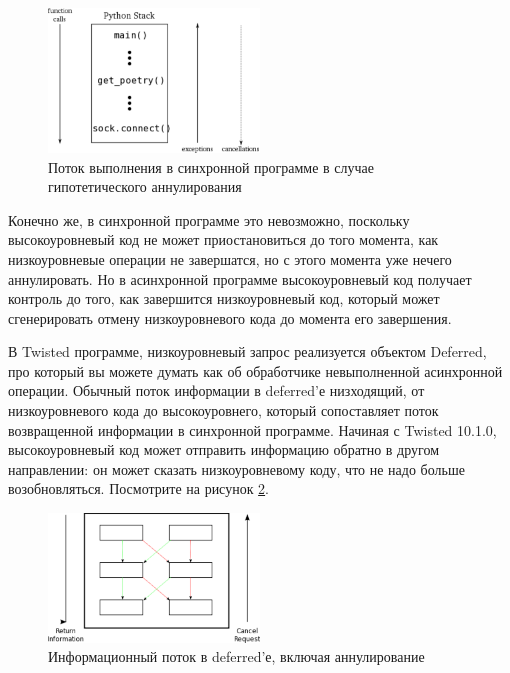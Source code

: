 \begin{figure}[h]
\begin{center}
    \includegraphics[width=0.5\textwidth]{images/sync-cancel.pdf}
    \caption{Поток выполнения в синхронной программе в случае гипотетического аннулирования\label{fig:sync-cancel}}
\end{center}
\end{figure}

Конечно же, в синхронной программе это невозможно, поскольку 
высокоуровневый код не может приостановиться до того 
момента, как низкоуровневые операции не завершатся, но с этого 
момента уже нечего аннулировать. Но в асинхронной программе 
высокоуровневый код получает контроль до того, как завершится 
низкоуровневый код, который может сгенерировать отмену низкоуровневого 
кода до момента его завершения.


В Twisted программе, низкоуровневый запрос реализуется 
объектом Deferred, про который вы можете думать как об 
обработчике невыполненной асинхронной операции. Обычный 
поток информации в deferred'е низходящий, от низкоуровневого 
кода до высокоуровнего, который сопоставляет поток возвращенной 
информации в синхронной программе. Начиная с Twisted 10.1.0, 
высокоуровневый код может отправить информацию обратно в 
другом направлении: он может сказать 
низкоуровневому коду, что не надо больше возобновляться. 
Посмотрите на рисунок \ref{fig:deferred-cancel}.

\begin{figure}[h]  
\begin{center}
    \includegraphics[width=0.5\textwidth]{images/deferred-cancel.pdf}
    \caption{Информационный поток в deferred'е, включая аннулирование\label{fig:deferred-cancel}}
\end{center}
\end{figure}


